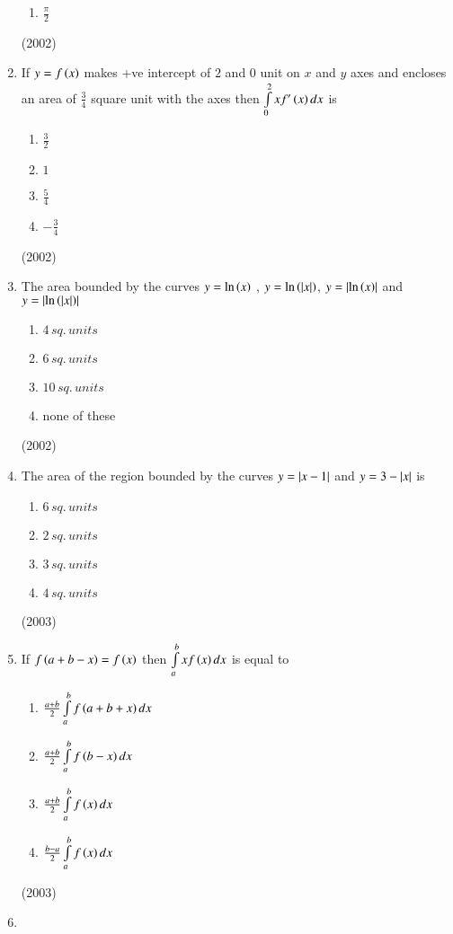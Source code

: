 \documentclass[journal,12pt,twocolumn]{IEEEtran}
\theoremstyle{remark}
\begin{document}
\begin{enumerate}
\begin{enumerate}
					\item $\frac{\pi}{2}$
			\end{enumerate}
			\hfill (2002)
	\item
		If $y=f\left(x\right)$ makes +ve intercept of $2$ and $0$ unit on $x$ and $y$ axes and encloses an area of $\frac{3}{4}$ square unit with the axes then $\int \limits_0^2 x f'\left(x\right)dx$ is
			\begin{enumerate}
				\item $\frac{3}{2}$
				\item $1$
				\item $\frac{5}{4}$
				\item $-\frac{3}{4}$
			\end{enumerate}
			\hfill (2002)
	\item
		The area bounded by the curves $y= \mathrm{ln} \left(x\right)$ , $y= \mathrm{ln} \left(\left\vert x\right\vert\right)$, $y=\left\vert\mathrm{ln}\left(x\right)\right\vert$ and $y=\left\vert \mathrm{ln} \left(\left\vert x\right\vert\right)\right\vert$
			\begin{enumerate}
					\item $4 \, sq. \, units$
					\item $6 \, sq. \, units$
					\item $10 \, sq. \, units$
					\item none of these
			\end{enumerate}
			\hfill(2002)
	\item
		The area of the region bounded by the curves $y= \left\vert x-1\right\vert$ and $y=3-\left\vert x\right\vert$ is
			\begin {enumerate}
				\item $6 \, sq. \, units$
				\item $2 \, sq. \, units$
				\item $3 \, sq. \, units$
				\item $4 \, sq. \, units$
			\end {enumerate}
			\hfill (2003)
	\item
		If $f\left(a+b-x\right)=f\left(x\right)$ then $\int \limits_a^b xf\left(x\right)dx$ is equal to
			\begin {enumerate}
				\item $\frac{a+b}{2} \int \limits_a^b f\left(a+b+x\right)dx$
				\item $\frac{a+b}{2} \int \limits_a^b f\left(b-x\right)dx$
				\item $\frac{a+b}{2} \int \limits_a^b f\left(x\right)dx$
				\item $\frac{b-a}{2} \int \limits_a^b f\left(x\right)dx$
			\end {enumerate}
			\hfill (2003)
	\item 

\end{enumerate}
\end{document}
